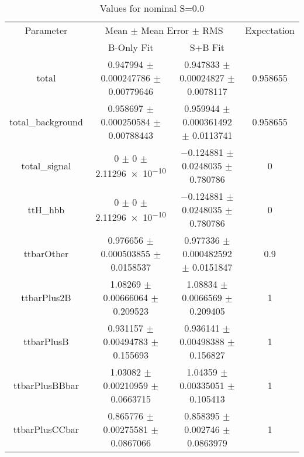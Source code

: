 \begin{table}
\centering
\caption{Values for nominal S=0.0}
\begin{tabular}{cccc}
\toprule
Parameter & \multicolumn{2}{c}{Mean $\pm$ Mean Error $\pm$ RMS} & Expectation\\
 & B-Only Fit & S+B Fit & \\
\midrule
total & \num{0.947994} $\pm$ \num{0.000247786} $\pm$ \num{0.00779646} & \num{0.947833} $\pm$ \num{0.00024827} $\pm$ \num{0.0078117} & \num{0.958655}\\
total\_background & \num{0.958697} $\pm$ \num{0.000250584} $\pm$ \num{0.00788443} & \num{0.959944} $\pm$ \num{0.000361492} $\pm$ \num{0.0113741} & \num{0.958655}\\
total\_signal & \num{0} $\pm$ \num{0} $\pm$ \num{2.11296e-10} & \num{-0.124881} $\pm$ \num{0.0248035} $\pm$ \num{0.780786} & \num{0}\\
ttH\_hbb & \num{0} $\pm$ \num{0} $\pm$ \num{2.11296e-10} & \num{-0.124881} $\pm$ \num{0.0248035} $\pm$ \num{0.780786} & \num{0}\\
ttbarOther & \num{0.976656} $\pm$ \num{0.000503855} $\pm$ \num{0.0158537} & \num{0.977336} $\pm$ \num{0.000482592} $\pm$ \num{0.0151847} & \num{0.9}\\
ttbarPlus2B & \num{1.08269} $\pm$ \num{0.00666064} $\pm$ \num{0.209523} & \num{1.08834} $\pm$ \num{0.0066569} $\pm$ \num{0.209405} & \num{1}\\
ttbarPlusB & \num{0.931157} $\pm$ \num{0.00494783} $\pm$ \num{0.155693} & \num{0.936141} $\pm$ \num{0.00498388} $\pm$ \num{0.156827} & \num{1}\\
ttbarPlusBBbar & \num{1.03082} $\pm$ \num{0.00210959} $\pm$ \num{0.0663715} & \num{1.04359} $\pm$ \num{0.00335051} $\pm$ \num{0.105413} & \num{1}\\
ttbarPlusCCbar & \num{0.865776} $\pm$ \num{0.00275581} $\pm$ \num{0.0867066} & \num{0.858395} $\pm$ \num{0.002746} $\pm$ \num{0.0863979} & \num{1}\\
\bottomrule
\end{tabular}
\end{table}